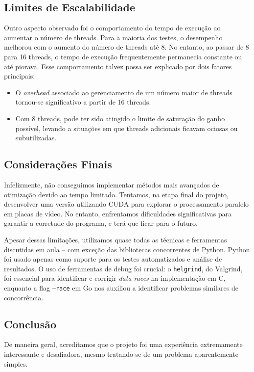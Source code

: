 \documentclass[14]{article}
\begin{document}
\subsection{Limites de Escalabilidade}

Outro aspecto observado foi o comportamento do tempo de execução ao aumentar o número de threads. Para a maioria dos testes, o desempenho melhorou com o aumento do número de threads até 8. No entanto, ao passar de 8 para 16 threads, o tempo de execução frequentemente permanecia constante ou até piorava. Esse comportamento talvez possa ser explicado por dois fatores principais:
\begin{itemize}
    \item O \textit{overhead} associado ao gerenciamento de um número maior de threads tornou-se significativo a partir de 16 threads.
    \item Com 8 threads, pode ter sido atingido o limite de saturação do ganho possível, levando a situações em que threads adicionais ficavam ociosas ou subutilizadas.
\end{itemize}


\subsection{Considerações Finais}

Infelizmente, não conseguimos implementar métodos mais avançados de otimização devido ao tempo limitado. Tentamos, na etapa final do projeto, desenvolver uma versão utilizando CUDA para explorar o processamento paralelo em placas de vídeo. No entanto, enfrentamos dificuldades significativas para garantir a corretude do programa, e terá que ficar para o futuro.

Apesar dessas limitações, utilizamos quase todas as técnicas e ferramentas discutidas em aula – com exceção das bibliotecas concorrentes de Python. Python foi usado apenas como suporte para os testes automatizados e análise de resultados. O uso de ferramentas de debug foi crucial: o \texttt{helgrind}, do Valgrind, foi essencial para identificar e corrigir \textit{data races} na implementação em C, enquanto a flag \texttt{--race} em Go nos auxiliou a identificar problemas similares de concorrência.

\subsection{Conclusão}

De maneira geral, acreditamos que o projeto foi uma experiência extremamente interessante e desafiadora, mesmo tratando-se de um problema aparentemente simples. 
\end{document}
